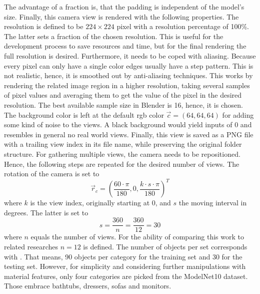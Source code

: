 The advantage of a fraction is, that the padding is independent of the model's size.
Finally, this camera view is rendered with the following properties.
The resolution is defined to be $224 \times 224$ pixel with a resolution percentage of 100\%.
The latter sets a fraction of the chosen resolution.
This is useful for the development process to save resources and time, but for the final rendering the full resolution is desired.
Furthermore, it needs to be coped with aliasing.
Because every pixel can only have a single color edges usually have a step pattern.
This is not realistic, hence, it is smoothed out by anti-aliasing techniques.
This works by rendering the related image region in a higher resolution, taking several samples of pixel values and averaging them to get the value of the pixel in the desired resolution.
The best available sample size in Blender is 16, hence, it is chosen.
The background color is left at the default rgb color $\vec{c} = (64, 64, 64)$ for adding some kind of noise to the views.
A black background would yield inputs of 0 and resembles in general no real world views.
Finally, this view is saved as a PNG file with a trailing view index in its file name, while preserving the original folder structure.
For gathering multiple views, the camera needs to be repositioned.
Hence, the following steps are repeated for the desired number of views.
The rotation of the camera is set to
\begin{equation}
	\vec{r}_c = \left(  \frac{60 \cdot \pi}{180}, 0, \frac{k \cdot s \cdot \pi}{180} \right)^T
\end{equation}
where $k$ is the view index, originally starting at 0, and $s$ the moving interval in degrees.
The latter is set to
\begin{equation}
	s = \frac{360}{n} = \frac{360}{12} = 30
\end{equation}
where $n$ equals the number of views.
For the ability of comparing this work to related researches $n = 12$ is defined.
The number of objects per set corresponds with \cite{Su:2015:MCN:2919332.2919750}.
That means, 90 objects per category for the training set and 30 for the testing set.
However, for simplicity and considering further manipulations with material features, only four categories are picked from the ModelNet10 dataset.
Those embrace bathtubs, dressers, sofas and monitors.